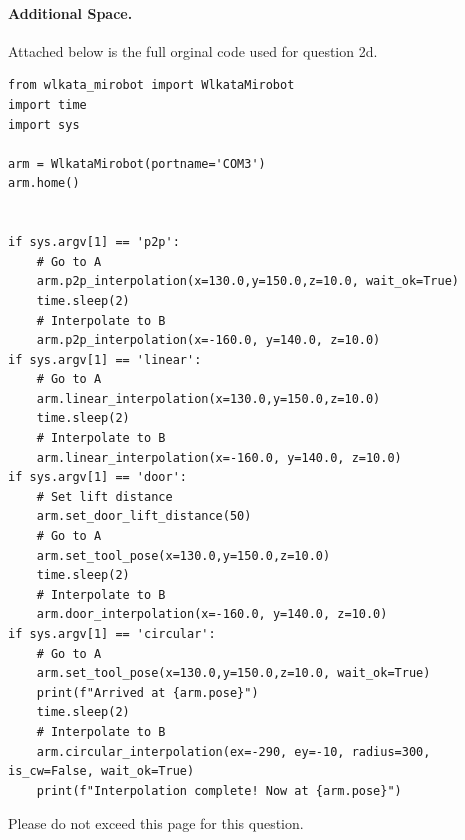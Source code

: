 \paragraph{Additional Space.}
Attached below is the full orginal code used for question 2d.
\begin{verbatim}
from wlkata_mirobot import WlkataMirobot
import time
import sys

arm = WlkataMirobot(portname='COM3')
arm.home()


if sys.argv[1] == 'p2p':
    # Go to A
    arm.p2p_interpolation(x=130.0,y=150.0,z=10.0, wait_ok=True)
    time.sleep(2)
    # Interpolate to B
    arm.p2p_interpolation(x=-160.0, y=140.0, z=10.0)
if sys.argv[1] == 'linear':
    # Go to A
    arm.linear_interpolation(x=130.0,y=150.0,z=10.0)
    time.sleep(2)
    # Interpolate to B
    arm.linear_interpolation(x=-160.0, y=140.0, z=10.0)
if sys.argv[1] == 'door':
    # Set lift distance
    arm.set_door_lift_distance(50)
    # Go to A
    arm.set_tool_pose(x=130.0,y=150.0,z=10.0)
    time.sleep(2)
    # Interpolate to B
    arm.door_interpolation(x=-160.0, y=140.0, z=10.0)
if sys.argv[1] == 'circular':
    # Go to A
    arm.set_tool_pose(x=130.0,y=150.0,z=10.0, wait_ok=True)
    print(f"Arrived at {arm.pose}")
    time.sleep(2)
    # Interpolate to B
    arm.circular_interpolation(ex=-290, ey=-10, radius=300, is_cw=False, wait_ok=True)
    print(f"Interpolation complete! Now at {arm.pose}")
\end{verbatim}
Please do not exceed this page for this question.
